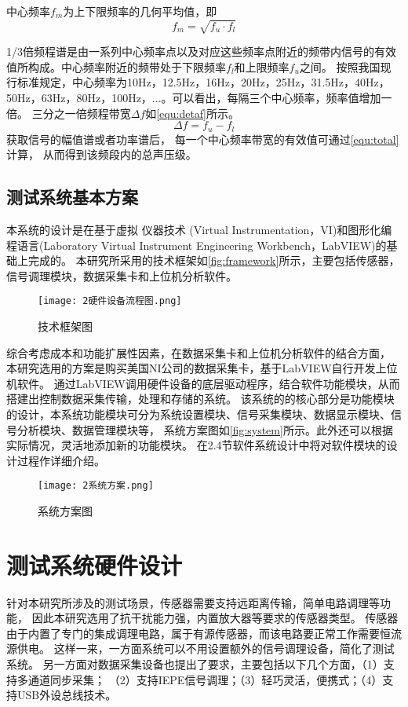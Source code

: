 中心频率$f_{m}$为上下限频率的几何平均值，即
\begin{equation}
    \label{equ:fm}
    f_{m}=\sqrt{f_{u}\cdot f_{l} } 
\end{equation}

1/3倍频程谱是由一系列中心频率点以及对应这些频率点附近的频带内信号的有效值所构成。中心频率附近的频带处于下限频率$f_l$和上限频率$f_u$之间。
按照我国现行标准规定，中心频率为10Hz，12.5Hz，16Hz，20Hz，25Hz，31.5Hz，40Hz，50Hz，63Hz，80Hz，100Hz，...。可以看出，每隔三个中心频率，频率值增加一倍。
三分之一倍频程带宽$\Delta f$如\autoref{equ:detaf}所示。
\begin{equation}
    \label{equ:detaf}
    \Delta f=f_{u}-f_{l}
\end{equation}
获取信号的幅值谱或者功率谱后，
每一个中心频率带宽的有效值可通过\autoref{equ:total}计算，
从而得到该频段内的总声压级。

\subsection{测试系统基本方案}
本系统的设计是在基于虚拟
仪器技术 (Virtual Instrumentation，VI)和图形化编
程语言(Laboratory Virtual Instrument Engineering
Workbench，LabVIEW)的基础上完成的。
本研究所采用的技术框架如\autoref{fig:framework}所示，主要包括传感器，信号调理模块，数据采集卡和上位机分析软件。
\begin{figure}[htbp]
    \centering
    \texttt{[image: 2硬件设备流程图.png]}
    \caption{\label{fig:framework}技术框架图}
\end{figure}

综合考虑成本和功能扩展性因素，在数据采集卡和上位机分析软件的结合方面，
本研究选用的方案是购买美国NI公司的数据采集卡，基于LabVIEW自行开发上位机软件。
通过LabVIEW调用硬件设备的底层驱动程序，结合软件功能模块，从而搭建出控制数据采集传输，处理和存储的系统。
该系统的的核心部分是功能模块的设计，本系统功能模块可分为系统设置模块、信号采集模块、数据显示模块、信号分析模块、数据管理模块等，
系统方案图如\autoref{fig:system}所示。此外还可以根据实际情况，灵活地添加新的功能模块。
在2.4节软件系统设计中将对软件模块的设计过程作详细介绍。
\begin{figure}[htbp]
    \centering
    \texttt{[image: 2系统方案.png]}
    \caption{\label{fig:system}系统方案图}
\end{figure}

\section{测试系统硬件设计}
针对本研究所涉及的测试场景，传感器需要支持远距离传输，简单电路调理等功能，
因此本研究选用了抗干扰能力强，内置放大器等要求的传感器类型。
传感器由于内置了专门的集成调理电路，属于有源传感器，而该电路要正常工作需要恒流源供电。
这样一来，一方面系统可以不用设置额外的信号调理设备，简化了测试系统。
另一方面对数据采集设备也提出了要求，主要包括以下几个方面，（1）支持多通道同步采集；
（2）支持IEPE信号调理；（3）轻巧灵活，便携式；（4）支持USB外设总线技术。

